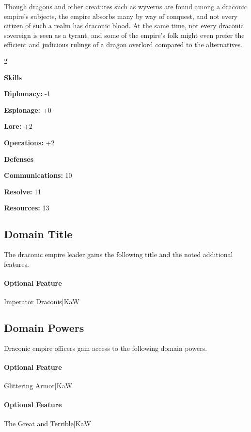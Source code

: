 \documentclass[10pt,a4paper,twoside,bg=print,twocolumn,openany,nodeprecatedcode]{dndbook}
\begin{document}
Though dragons and other creatures such as wyverns are found among a draconic empire's subjects, the empire absorbs many by way of conquest, and not every citizen of such a realm has draconic blood. At the same time, not every draconic sovereign is seen as a tyrant, and some of the empire's folk might even prefer the efficient and judicious rulings of a dragon overlord compared to the alternatives.


\begin{itemize}
\begin{multicols}{2}
\item \textbf{Skills}
\item \textbf{Diplomacy:} -1
\item \textbf{Espionage:} +0
\item \textbf{Lore:} +2
\item \textbf{Operations:} +2
\item \textbf{Defenses}
\item \textbf{Communications:} 10
\item \textbf{Resolve:} 11
\item \textbf{Resources:} 13
\end{multicols}

\end{itemize}

\subsection{Domain Title}
The draconic empire leader gains the following title and the noted additional features.

\paragraph{Optional Feature}
Imperator Draconis|KaW

\subsection{Domain Powers}
Draconic empire officers gain access to the following domain powers.

\paragraph{Optional Feature}
Glittering Armor|KaW

\paragraph{Optional Feature}
The Great and Terrible|KaW
\end{document}
